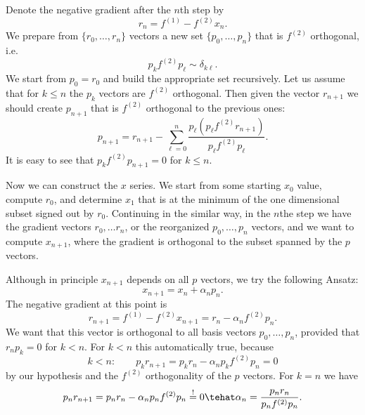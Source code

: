 \documentclass[10pt,a4paper]{article}
\begin{document}
Denote the negative gradient after the $n$th step by
\begin{equation}
r_n= f^{(1)} - f^{(2)} x_n.
\end{equation}
We prepare from $\{r_0,\dots,r_n\}$ vectors a new set $\{p_0,\dots,p_n\}$ that is $f^{(2)}$ orthogonal, i.e.
\begin{equation}
p_k f^{(2)} p_\ell \sim \delta_{k\ell}.
\end{equation}
We start from $p_0=r_0$ and build the appropriate set recursively. Let us assume that for $k\le n$ the $p_k$ vectors are $f^{(2)}$ orthogonal. Then given the vector $r_{n+1}$ we should create $p_{n+1}$ that is $f^{(2)}$ orthogonal to the previous ones:
\begin{equation}
  \label{eq:pn}
p_{n+1} = r_{n+1} - \sum_{\ell=0}^{n} \frac{p_ \ell (p_\ell f^{(2)} r_{n+1})}{p_\ell f^{(2)} p_\ell}.
\end{equation}
It is easy to see that $p_k f^{(2)}p_{n+1} = 0$ for $k\le n$.

Now we can construct the $x$ series. We start from some starting $x_0$ value, compute $r_0$, and determine $x_1$ that is at the minimum of the one dimensional subset signed out by $r_0$. Continuing in the similar way, in the $n$the step we have the gradient vectors $r_0,\dots r_{n}$, or the reorganized $p_0, \dots,p_{n}$ vectors, and we want to compute $x_{n+1}$, where the gradient is orthogonal to the subset spanned by the $p$ vectors.

Although in principle $x_{n+1}$ depends on all $p$ vectors, we try the following Ansatz:
\begin{equation}
x_{n+1} = x_n + \alpha_n p_n.
\end{equation}
The negative gradient at this point is
\begin{equation}
  \label{eq:rnpl1}
  r_{n+1} = f^{(1)} - f^{(2)}x_{n+1} = r_n - \alpha_n f^{(2)}p_n.
\end{equation}
We want that this vector is orthogonal to all basis vectors $p_0,\dots,p_n$, provided that $r_n p_k=0$ for $k<n$. For $k<n$ this automatically true, because
\begin{equation}
  k<n:\qquad p_kr_{n+1} = p_k r_n -\alpha_n p_k f^{(2)}p_n = 0
\end{equation}
by our hypothesis and the $f^{(2)}$ orthogonality of the $p$ vectors. For $k=n$ we have
\begin{equation}
  p_nr_{n+1} = p_n r_n - \alpha_n p_n f^{(2)}p_n \stackrel!= 0 \tehat \alpha_n = \frac{p_n r_n}{p_n f^{(2)} p_n}.
\end{equation}
\end{document}
